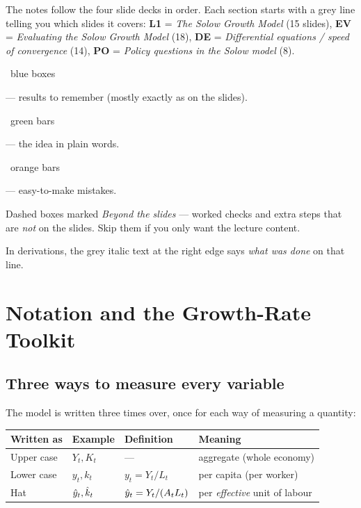 \documentclass[11pt]{article}
\begin{document}

\begin{recap}
The notes follow the four slide decks in order. Each section starts with a grey line telling you which slides it covers:
\textbf{L1} = \emph{The Solow Growth Model} (15 slides),
\textbf{EV} = \emph{Evaluating the Solow Growth Model} (18),
\textbf{DE} = \emph{Differential equations / speed of convergence} (14),
\textbf{PO} = \emph{Policy questions in the Solow model} (8).
\begin{flatlist}
  \item \colorbox{keybg}{\strut\ blue boxes\ } --- results to remember (mostly exactly as on the slides).
  \item \colorbox{intbg}{\strut\ green bars\ } --- the idea in plain words.
  \item \colorbox{pitbg}{\strut\ orange bars\ } --- easy-to-make mistakes.
  \item Dashed boxes marked \emph{Beyond the slides} --- worked checks and extra steps that are \emph{not} on the slides. Skip them if you only want the lecture content.
  \item In derivations, the grey italic text at the right edge says \emph{what was done} on that line.
\end{flatlist}
\end{recap}

{\small\tableofcontents}
\newpage

\section{Notation and the Growth-Rate Toolkit}

\subsection{Three ways to measure every variable}

The model is written three times over, once for each way of measuring a quantity:

\begin{center}
\renewcommand{\arraystretch}{1.35}
\begin{tabular}{@{}lllp{5.4cm}@{}}
\toprule
Written as & Example & Definition & Meaning \\
\midrule
Upper case & $Y_t, K_t$ & --- & aggregate (whole economy) \\
Lower case & $y_t, k_t$ & $y_t = Y_t/L_t$ & per capita (per worker) \\
Hat & $\hat{y}_t, \hat{k}_t$ & $\hat{y}_t = Y_t/(A_tL_t)$ & per \emph{effective} unit of labour \\
\bottomrule
\end{tabular}
\end{center}
\end{document}
